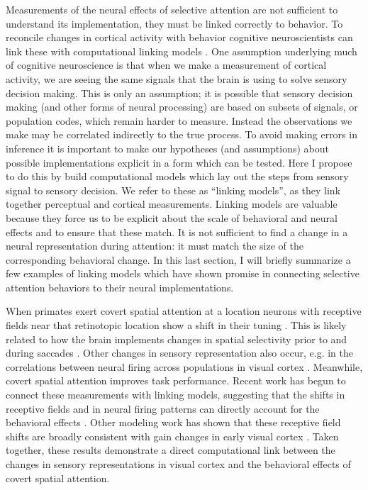 Measurements of the neural effects of selective attention are not sufficient to understand its implementation, they must be linked correctly to behavior. To reconcile changes in cortical activity with behavior cognitive neuroscientists can link these with computational linking models \citep{Barlow1972-kz,Brindley1960-gq,Cohen2010-xs,Newsome1989-fr,Pestilli2011-gi,Cook2002-zs}. One assumption underlying much of cognitive neuroscience is that when we make a measurement of cortical activity, we are seeing the same signals that the brain is using to solve sensory decision making. This is only an assumption; it is possible that sensory decision making (and other forms of neural processing) are based on subsets of signals, or population codes, which remain harder to measure. Instead the observations we make may be correlated indirectly to the true process. To avoid making errors in inference it is important to make our hypotheses (and assumptions) about possible implementations explicit in a form which can be tested. Here I propose to do this by build computational models which lay out the steps from sensory signal to sensory decision. We refer to these as ``linking models'', as they link together perceptual and cortical measurements. Linking models are valuable because they force us to be explicit about the scale of behavioral and neural effects and to ensure that these match. It is not sufficient to find a change in a neural representation during attention: it must match the size of the corresponding behavioral change. In this last section, I will briefly summarize a few examples of linking models which have shown promise in connecting selective attention behaviors to their neural implementations. 

When primates exert covert spatial attention at a location neurons with receptive fields near that retinotopic location show a shift in their tuning \citep{Klein2014-oe,Womelsdorf2008-bm,Womelsdorf2006-np,Connor1996-nm}. This is likely related to how the brain implements changes in spatial selectivity prior to and during saccades \citep{Tolias2001-xl,Moore2001-qz,Moore2003-kz}. Other changes in sensory representation also occur, e.g. in the correlations between neural firing across populations in visual cortex \citep{Cohen2009-bt}. Meanwhile, covert spatial attention improves task performance. Recent work has begun to connect these measurements with linking models, suggesting that the shifts in receptive fields and in neural firing patterns can directly account for the behavioral effects \citep{Klein2016-ox,Vo2017-oi,Cohen2011-pa,Cohen2009-bt}. Other modeling work has shown that these receptive field shifts are broadly consistent with gain changes in early visual cortex \citep{Baruch2014-gy,Miconi2016-ip}. Taken together, these results demonstrate a direct computational link between the changes in sensory representations in visual cortex and the behavioral effects of covert spatial attention. 
 
